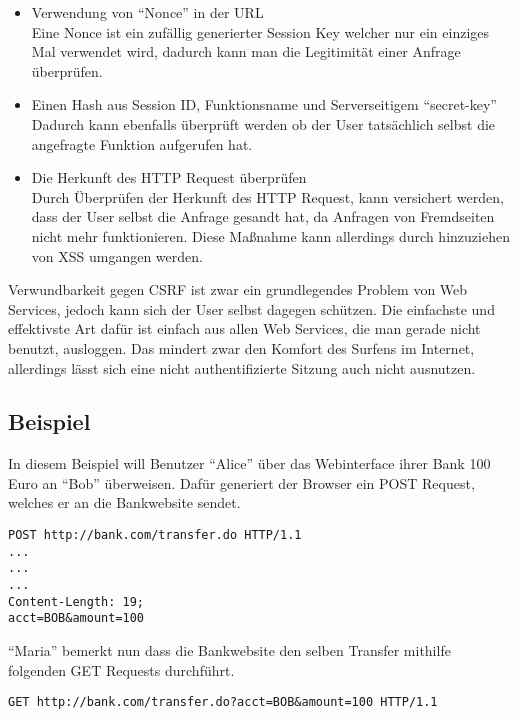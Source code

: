 \begin{itemize}
\item Verwendung von ``Nonce'' in der URL\\
Eine Nonce ist ein zuf\"allig generierter Session Key welcher nur ein einziges Mal verwendet wird, dadurch kann man die Legitimit\"at einer Anfrage \"uberpr\"ufen.\\
\item Einen Hash aus Session ID, Funktionsname und Serverseitigem ``secret-key''\\
Dadurch kann ebenfalls \"uberpr\"uft werden ob der User tats\"achlich selbst die angefragte Funktion aufgerufen hat.\\
\item Die Herkunft des HTTP Request \"uberpr\"ufen\\
Durch \"Uberpr\"ufen der Herkunft des HTTP Request, kann versichert werden, dass der User selbst die Anfrage gesandt hat, da Anfragen von Fremdseiten nicht mehr funktionieren. Diese Ma{\ss}nahme kann allerdings durch hinzuziehen von XSS umgangen werden.
\end{itemize}

Verwundbarkeit gegen CSRF ist zwar ein grundlegendes Problem von Web Services, jedoch kann sich der User selbst dagegen sch\"utzen. Die einfachste und effektivste Art daf\"ur ist einfach aus allen Web Services, die man gerade nicht benutzt, ausloggen. Das mindert zwar den Komfort des Surfens im Internet, allerdings l\"asst sich eine nicht authentifizierte Sitzung auch nicht ausnutzen.
\cite{owaspCSRF}

\clearpage
\subsection{Beispiel}
In diesem Beispiel will Benutzer ``Alice'' \"uber das Webinterface ihrer Bank 100 Euro an ``Bob'' \"uberweisen. Daf\"ur generiert der Browser ein POST Request, welches er an die Bankwebsite sendet.
\begin{lstlisting}[caption = Normaler POST Request]
POST http://bank.com/transfer.do HTTP/1.1
...
...
...
Content-Length: 19;
acct=BOB&amount=100
\end{lstlisting}

``Maria'' bemerkt nun dass die Bankwebsite den selben Transfer mithilfe folgenden GET Requests durchf\"uhrt.

\begin{lstlisting}[caption = Normaler GET Request]
GET http://bank.com/transfer.do?acct=BOB&amount=100 HTTP/1.1
\end{lstlisting}

